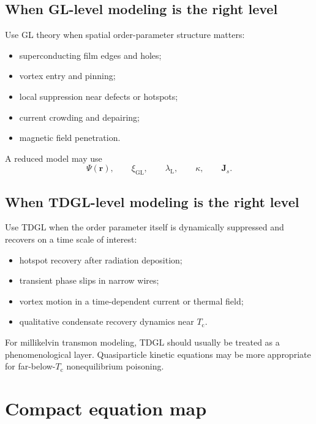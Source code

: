 \documentclass[11pt]{article}
\numberwithin{equation}{section}
\newcommand{\rvec}{\bm{r}}
\newcommand{\Jvec}{\bm{J}}
\newcommand{\Tc}{T_{\mathrm{c}}}
\newcommand{\xiGL}{\xi_{\mathrm{GL}}}
\newcommand{\lambdaL}{\lambda_{\mathrm{L}}}
\begin{document}
\subsection{When GL-level modeling is the right level}

Use GL theory when spatial order-parameter structure matters:
\begin{itemize}[leftmargin=2em]
\item superconducting film edges and holes;
\item vortex entry and pinning;
\item local suppression near defects or hotspots;
\item current crowding and depairing;
\item magnetic field penetration.
\end{itemize}
A reduced model may use
\begin{equation}
\Psi(\rvec),\qquad \xiGL,\qquad \lambdaL,\qquad \kappa,\qquad \Jvec_s.
\end{equation}

\subsection{When TDGL-level modeling is the right level}

Use TDGL when the order parameter itself is dynamically suppressed and recovers on a time scale of interest:
\begin{itemize}[leftmargin=2em]
\item hotspot recovery after radiation deposition;
\item transient phase slips in narrow wires;
\item vortex motion in a time-dependent current or thermal field;
\item qualitative condensate recovery dynamics near $\Tc$.
\end{itemize}
For millikelvin transmon modeling, TDGL should usually be treated as a phenomenological layer. Quasiparticle kinetic equations may be more appropriate for far-below-$\Tc$ nonequilibrium poisoning.

\section{Compact equation map}
\end{document}
